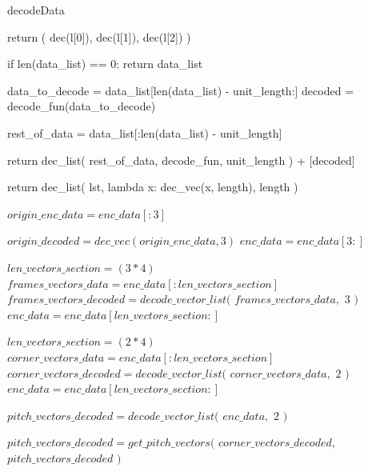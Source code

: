\documentclass[
11pt,
twoside
]{report}
\begin{document}
\begin{algorithm}
\begin{algorithmic}


\caption{decodeData}\label{alg:cap}

    return (
        dec(l[0]),
        dec(l[1]),
        dec(l[2])
    )
\EndProcedure


    if len(data\_list) == 0:
        return data\_list

    data\_to\_decode = data\_list[len(data\_list) - unit\_length:]
    decoded = decode\_fun(data\_to\_decode)

    rest\_of\_data = data\_list[:len(data\_list) - unit\_length]

    return dec\_list(
            rest\_of\_data,
            decode\_fun,
            unit\_length
    ) + [decoded]
\EndProcedure


    return dec\_list(
        lst,
        lambda x: dec\_vec(x, length),
        length
    )
\EndProcedure



    \State $origin\_enc\_data = enc\_data[:3]$

    \State $origin\_decoded = dec\_vec(origin\_enc\_data, 3)$
    \State $enc\_data = enc\_data[3: ]$

    \State $len\_vectors\_section = (3 * 4)$
    \State $frames\_vectors\_data = enc\_data[ :len\_vectors\_section]$
    \State $frames\_vectors\_decoded = decode\_vector\_list($
            \State $frames\_vectors\_data,$
            \State $3$
    \State $)$
    \State $enc\_data = enc\_data[len\_vectors\_section: ]$

    \State $len\_vectors\_section = (2 * 4)$
    \State $corner\_vectors\_data = enc\_data[ :len\_vectors\_section]$
    \State $corner\_vectors\_decoded = decode\_vector\_list($
            \State $corner\_vectors\_data,$
            \State $2$
    \State $)$
    \State $enc\_data = enc\_data[len\_vectors\_section: ]$

    \State $pitch\_vectors\_decoded = decode\_vector\_list($
            \State $enc\_data,$
            \State $2$
    \State $)$

    \State $pitch\_vectors\_decoded = get\_pitch\_vectors($
        \State $corner\_vectors\_decoded,$
        \State $pitch\_vectors\_decoded$
    \State $)$


\end{algorithmic}
\end{algorithm}
\end{document}
